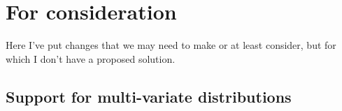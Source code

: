 \documentclass[a4paper,11pt]{article}
\newcommand{\pharmml}{PharmML\xspace}
\begin{document}




\section{For consideration}

Here I've put changes that we may need to make or at least consider,
but for which I don't have a proposed solution.

\subsection{Support for multi-variate distributions}
\end{document}
